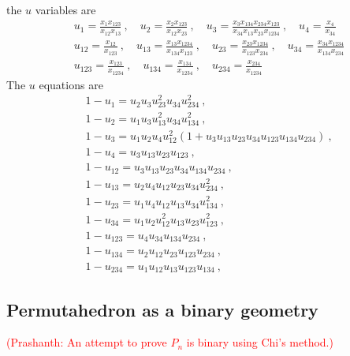 \documentclass[hidelinks,12pt]{article}
\begin{document}
the $u$ variables are 
\begin{align}
   &u_{1}=\frac{x_{1}x_{123}}{x_{12}x_{13}} \:, \quad  u_{2}=\frac{x_{2}x_{123}}{x_{12}x_{23}} \:,  \quad 
   u_{3}=\frac{x_{3}x_{134}x_{234}x_{123}}{x_{34}x_{13}x_{23}x_{1234}} \:, \quad 
   u_{4}=\frac{x_{4}}{x_{34}} \\
   &u_{12}=\frac{x_{12}}{x_{123}} \:, \quad u_{13}=\frac{x_{13}x_{1234}}{x_{134}x_{123}} \:,\quad 
   u_{23}=\frac{x_{23}x_{1234}}{x_{123}x_{234}} \:, \quad u_{34}=\frac{x_{34}x_{1234}}{x_{134}x_{234}} \\
   &u_{123}=\frac{x_{123}}{x_{1234}} \:, \quad u_{134}=\frac{x_{134}}{x_{1234}} \:, \quad 
   u_{234}=\frac{x_{234}}{x_{1234}}
\end{align}
The $u$ equations are
\begin{align}
   &1-u_{1}=u_{2}u_{3}u_{23}^{2}u_{34}u_{234}^{2} \:, \\
   &1-u_{2}=u_{1}u_{3}u_{13}^{2}u_{34}u_{134}^{2} \:, \\
   &1-u_{3}= u_{1}u_{2}u_{4}u_{12}^{2}(1+u_{3}u_{13}u_{23}u_{34}u_{123}u_{134}u_{234}) \:, \\
   &1-u_{4}=u_{3}u_{13}u_{23}u_{123}  \:, \\
   &1-u_{12} =u_{3}u_{13}u_{23}u_{34}u_{134}u_{234} \:, \\
   &1-u_{13} =u_{2}u_{4}u_{12}u_{23}u_{34}u_{234}^{2} \:, \\
   &1-u_{23}= u_{1}u_{4}u_{12}u_{13}u_{34}u_{134}^{2} \:, \\
   &1-u_{34}= u_{1}u_{2}u_{12}^{2}u_{13}u_{23}u_{123}^{2} \:, \\
   &1-u_{123}=u_{4}u_{34}u_{134}u_{234} \:, \\
   &1-u_{134}=u_{2}u_{12}u_{23}u_{123}u_{234} \:, \\
   &1-u_{234}=u_{1}u_{12}u_{13}u_{123}u_{134} \:, 
\end{align} 
\subsection{Permutahedron as a binary geometry}

\textcolor{red}{(Prashanth: An attempt to prove $P_n$ is binary using Chi's method.)}
\end{document}
